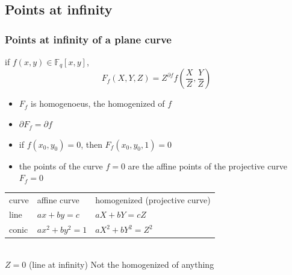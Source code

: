 \documentclass[10pt]{beamer} %
\newcommand{\F}{\mathbb F}
\theoremstyle{definition}
\begin{document}
\subsection{Points at infinity}
\begin{frame}
\frametitle{Points at infinity of a plane curve}

\begin{Definition}
if $f(x,y)\in\F_q[x,y]$,
$$F_f(X,Y,Z)=Z^{\partial f}f(\frac{X}{Z},\frac{Y}{Z})$$ \vspace*{-2pt}\pause
\begin{itemize}[<+-| alert@+>]
 \item $F_f$ is homogenoeus, \alert{the homogenized of $f$}
 \item $\partial F_f=\partial f$
\item if $f(x_0,y_0)=0$, then $F_f(x_0,y_0,1)=0$
\item the points of the curve $f=0$ are the affine points of
the projective curve $F_f=0$
\end{itemize}
\end{Definition}\pause

\begin{example}\pause
\begin{tabular}{|l|l|l|}
\hline
 curve & affine curve & homogenized (projective curve) \\
line & $ax+by=c$ & $aX+bY=cZ$\\
conic & $ax^2+by^2=1$& $aX^2+bY^2=Z^2$\\
\hline
\end{tabular}\\ \pause
$Z=0$ (line at infinity)\hfill \pause
Not the homogenized of anything
\end{example}
\end{frame}
\end{document}

